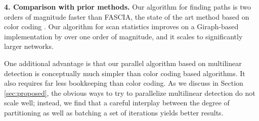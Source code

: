 \noindent
\textbf{4. Comparison with prior methods.}
Our algorithm for finding paths is two orders of magnitude faster than FASCIA, the state of the art method based on color coding \cite{slota:icpp13, slota:ipdps14}.
Our algorithm for scan statistics improves on a Giraph-based implementation \cite{cadena:bigdata17} by over one order of magnitude, and it scales to significantly larger networks.

One additional advantage is that our parallel algorithm based on multilinear detection is conceptually much simpler than color coding based algorithms. It also requires far less bookkeeping than color coding. As we discuss in Section \ref{sec:proposed}, the obvious ways to try to parallelize multilinear detection do not scale well; instead, we find that a careful interplay between the degree of partitioning as well as batching a set of iterations yields better results.



